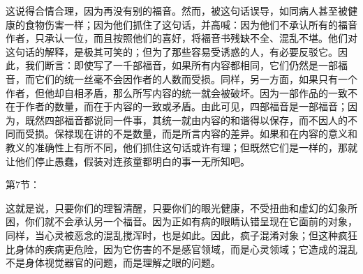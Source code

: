 这说得合情合理，因为再没有别的福音。然而，被这句话误导，如同病人甚至被健康的食物伤害一样；因为他们抓住了这句话，并高喊：因为他们不承认所有的福音作者，只承认一位，而且按照他们的喜好，将福音书残缺不全、混乱不堪。他们对这句话的解释，是极其可笑的；但为了那些容易受诱惑的人，有必要反驳它。因此，我们断言：即使写了一千部福音，如果所有内容都相同，它们仍然是一部福音，而它们的统一丝毫不会因作者的人数而受损。同样，另一方面，如果只有一个作者，但他却自相矛盾，那么所写内容的统一就会被破坏。因为一部作品的一致不在于作者的数量，而在于内容的一致或矛盾。由此可见，四部福音是一部福音；因为，既然四部福音都说同一件事，其统一就由内容的和谐得以保存，而不因人的不同而受损。保禄现在讲的不是数量，而是所言内容的差异。如果和在内容的意义和教义的准确性上有所不同，他们抓住这句话或许有理；但既然它们是一样的，那就让他们停止愚蠢，假装对连孩童都明白的事一无所知吧。\par

第7节： \par

这就是说，只要你们的理智清醒，只要你们的眼光健康，不受扭曲和虚幻的幻象所困，你们就不会承认另一个福音。因为正如有病的眼睛认错呈现在它面前的对象，同样，当心灵被恶念的混乱搅浑时，也是如此。因此，疯子混淆对象；但这种疯狂比身体的疾病更危险，因为它伤害的不是感官领域，而是心灵领域；它造成的混乱不是身体视觉器官的问题，而是理解之眼的问题。\par

